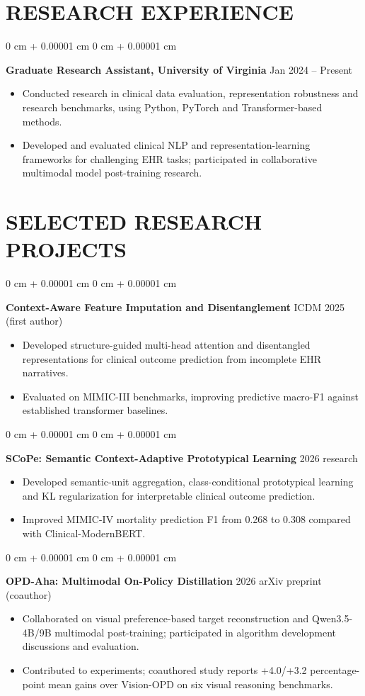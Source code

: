 \documentclass[10pt, letterpaper]{article}
\newenvironment{highlights}{
    \begin{itemize}[
        topsep=0.03 cm,
        parsep=0.03 cm,
        partopsep=0pt,
        itemsep=0pt,
        leftmargin=0 cm + 10pt
    ]
}{
    \end{itemize}
} %
\newenvironment{onecolentry}{
    \begin{adjustwidth}{
        0 cm + 0.00001 cm
    }{
        0 cm + 0.00001 cm
    }
}{
    \end{adjustwidth}
} %
\begin{document}
\section{RESEARCH EXPERIENCE}
\begin{onecolentry}
\textbf{Graduate Research Assistant, University of Virginia} \hfill Jan 2024 -- Present
\begin{highlights}
\item Conducted research in clinical data evaluation, representation robustness and research benchmarks, using Python, PyTorch and Transformer-based methods.
\item Developed and evaluated clinical NLP and representation-learning frameworks for challenging EHR tasks; participated in collaborative multimodal model post-training research.
\end{highlights}
\end{onecolentry}
\section{SELECTED RESEARCH PROJECTS}
\begin{onecolentry}
\textbf{Context-Aware Feature Imputation and Disentanglement} \hfill ICDM 2025 (first author)
\begin{highlights}
\item Developed structure-guided multi-head attention and disentangled representations for clinical outcome prediction from incomplete EHR narratives.
\item Evaluated on MIMIC-III benchmarks, improving predictive macro-F1 against established transformer baselines.
\end{highlights}
\end{onecolentry}
\vspace{0.025 cm}
\begin{onecolentry}
\textbf{SCoPe: Semantic Context-Adaptive Prototypical Learning} \hfill 2026 research
\begin{highlights}
\item Developed semantic-unit aggregation, class-conditional prototypical learning and KL regularization for interpretable clinical outcome prediction.
\item Improved MIMIC-IV mortality prediction F1 from 0.268 to 0.308 compared with Clinical-ModernBERT.
\end{highlights}
\end{onecolentry}
\vspace{0.025 cm}
\begin{onecolentry}
\textbf{OPD-Aha: Multimodal On-Policy Distillation} \hfill 2026 arXiv preprint (coauthor)
\begin{highlights}
\item Collaborated on visual preference-based target reconstruction and Qwen3.5-4B/9B multimodal post-training; participated in algorithm development discussions and evaluation.
\item Contributed to experiments; coauthored study reports +4.0/+3.2 percentage-point mean gains over Vision-OPD on six visual reasoning benchmarks.
\end{highlights}
\end{onecolentry}
\vspace{0.025 cm}
\end{document}
